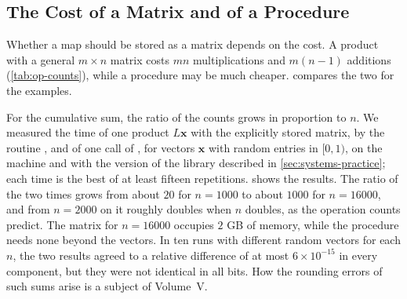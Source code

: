 \subsection{The Cost of a Matrix and of a Procedure}

Whether a map should be stored as a matrix depends on the cost. A product with a general $m\times n$ matrix costs $mn$ multiplications and $m(n-1)$ additions (\cref{tab:op-counts}), while a procedure may be much cheaper.  compares the two for the examples.

\begin{table}
\end{table}

For the cumulative sum, the ratio of the counts grows in proportion to $n$. We measured the time of one product $L\mathbf x$ with the explicitly stored matrix, by the routine , and of one call of , for vectors $\mathbf x$ with random entries in $[0,1)$, on the machine and with the version of the library described in \cref{sec:systems-practice}; each time is the best of at least fifteen repetitions.  shows the results. The ratio of the two times grows from about $20$ for $n=1000$ to about $1000$ for $n=16000$, and from $n=2000$ on it roughly doubles when $n$ doubles, as the operation counts predict. The matrix for $n=16000$ occupies $2$ GB of memory, while the procedure needs none beyond the vectors. In ten runs with different random vectors for each $n$, the two results agreed to a relative difference of at most $6\times10^{-15}$ in every component, but they were not identical in all bits. How the rounding errors of such sums arise is a subject of Volume~V.

